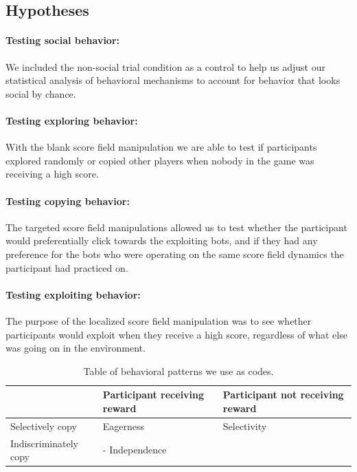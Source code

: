 \documentclass[12pt,letterpaper]{article}
\begin{document}
\subsection{Hypotheses}

\paragraph{Testing social behavior:} We included the non-social trial condition as a control to help us adjust our statistical analysis of behavioral mechanisms to account for behavior that looks social by chance. 

\paragraph{Testing exploring behavior:}  With the blank score field manipulation we are able to test if participants explored randomly or copied other players when nobody in the game was receiving a high score. 

\paragraph{Testing copying behavior:}  The targeted score field manipulations allowed us to test whether the participant would preferentially click towards the exploiting bots, and if they had any preference for the bots who were operating on the same score field dynamics the participant had practiced on.

\paragraph{Testing exploiting behavior:}  The purpose of the localized score field manipulation was to see whether participants would exploit when they receive a high score, regardless of what else was going on in the environment.

\begin{table}[]
\begin{tabular}{l|l|l}
                      & Participant receiving reward & Participant not receiving reward  \\ \hline
Selectively copy  & Eagerness                  & \multicolumn{1}{l|}{Selectivity} \\ \hline
Indiscriminately copy &  \multicolumn{2}{l|}{ - Independence}  \\ \cline{1-3} 
\end{tabular}
\caption{Table of behavioral patterns we use as codes.}
\end{table}
\end{document}
